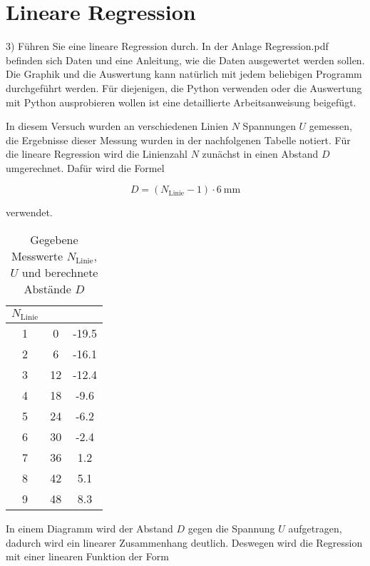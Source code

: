 \section{Lineare Regression}
\label{sec:3}

3) Führen Sie eine lineare Regression durch. In der Anlage Regression.pdf befinden sich Daten und eine Anleitung, wie die Daten ausgewertet werden sollen.
Die Graphik und die Auswertung kann natürlich mit jedem beliebigen Programm
durchgeführt werden. Für diejenigen, die Python verwenden oder die Auswertung
mit Python ausprobieren wollen ist eine detaillierte Arbeitsanweisung beigefügt.

In diesem Versuch wurden an verschiedenen Linien $N$ Spannungen $U$ gemessen, die Ergebnisse dieser Messung wurden in der nachfolgenen Tabelle notiert.
Für die lineare Regression wird die Linienzahl $N$ zunächst in einen Abstand $D$ umgerechnet.
Dafür wird die Formel

\begin{equation}
    D = (N_\text{Linie} - 1) \cdot \SI{6}{\milli\meter}
\end{equation}

verwendet.

\begin{table}
    \centering
    \label{tab:werte}
    \begin{tabular}{S S S}
        \toprule
        {$N_{\text{Linie}}$} &  &  \\
         & 0 & -19.5 \\
        2 & 6 & -16.1 \\
        3 & 12 & -12.4 \\
        4 & 18 & -9.6 \\
        5 & 24 & -6.2 \\
        6 & 30 & -2.4 \\
        7 & 36 & 1.2 \\
        8 & 42 & 5.1 \\
        9 & 48 & 8.3 \\
        \bottomrule
    \end{tabular}
    \caption{Gegebene Messwerte $N_\text{Linie}$, $U$ und berechnete Abstände $D$}
\end{table}

In einem Diagramm wird der Abstand $D$ gegen die Spannung $U$ aufgetragen, dadurch wird ein linearer Zusammenhang deutlich.
Deswegen wird die Regression mit einer linearen Funktion der Form

